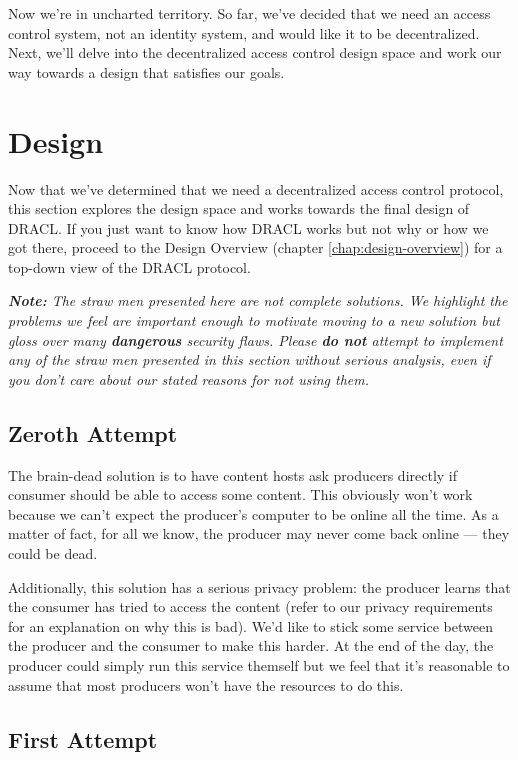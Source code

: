 \documentclass[pdftex,12pt,a4papaer,twoside,notitlepage]{report}
\newcommand{\note}[1]{\textit{\textbf{Note:} #1}}
\begin{document}
Now we're in uncharted territory. So far, we've decided that we need an access
control system, not an identity system, and would like it to be decentralized.
Next, we'll delve into the decentralized access control design space and work
our way towards a design that satisfies our goals.

\section{Design}
\label{sec:design}

Now that we've determined that we need a decentralized access control protocol,
this section explores the design space and works towards the final design of
DRACL. If you just want to know how DRACL works but not why or how we got there,
proceed to the Design Overview (chapter \ref{chap:design-overview}) for a
top-down view of the DRACL protocol.

\note{The straw men presented here are not complete solutions. We highlight the
  problems we feel are important enough to motivate moving to a new solution but
  gloss over many \textbf{dangerous} security flaws. Please \textbf{do not}
  attempt to implement any of the straw men presented in this section without
  serious analysis, even if you don't care about our stated reasons for not using
  them.}

\subsection{Zeroth Attempt}

The brain-dead solution is to have content hosts ask producers directly if
consumer should be able to access some content. This obviously won't work
because we can't expect the producer's computer to be online all the time. As a
matter of fact, for all we know, the producer may never come back online ---
they could be dead.

Additionally, this solution has a serious privacy problem: the producer learns
that the consumer has tried to access the content (refer to our privacy
requirements for an explanation on why this is bad). We'd like to stick some
service between the producer and the consumer to make this harder. At the end of
the day, the producer could simply run this service themself but we feel that
it's reasonable to assume that most producers won't have the resources to do
this.

\subsection{First Attempt}
\end{document}
